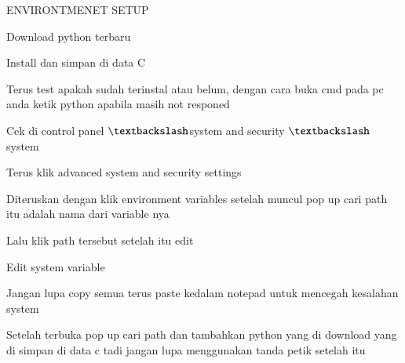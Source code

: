 \documentclass[a4paper,12pt]{report}
\begin{document}
\sloppy
{\fontsize{14pt}{14pt}\selectfont ENVIRONTMENET SETUP \\} \par
\vspace{14pt}
\noindent 
{\fontsize{14pt}{14pt}\selectfont Download python terbaru \\} \par
\vspace{14pt}
\noindent 
{\fontsize{14pt}{14pt}\selectfont Install dan simpan di data C \\} \par
\vspace{14pt}
\noindent 
{\fontsize{14pt}{14pt}\selectfont Terus test apakah sudah terinstal atau belum, dengan cara buka cmd pada pc anda ketik python apabila masih not responed \\} \par
\vspace{14pt}
\noindent 
{\fontsize{14pt}{14pt}\selectfont Cek di control panel $  \textbackslash  $system and security $  \textbackslash  $system \\} \par
\vspace{14pt}
\noindent 
{\fontsize{14pt}{14pt}\selectfont Terus klik advanced system and security settings \\} \par
\vspace{14pt}
\noindent 
{\fontsize{14pt}{14pt}\selectfont Diteruskan dengan klik environment variables setelah muncul pop up cari path itu adalah nama dari variable nya \\} \par
\vspace{14pt}
\noindent 
{\fontsize{14pt}{14pt}\selectfont Lalu klik path tersebut setelah itu edit \\} \par
\vspace{14pt}
\noindent 
{\fontsize{14pt}{14pt}\selectfont Edit system variable \\} \par
\vspace{14pt}
\noindent 
{\fontsize{14pt}{14pt}\selectfont Jangan lupa copy semua terus paste kedalam notepad untuk mencegah kesalahan system \\} \par
\vspace{14pt}
\noindent 
{\fontsize{14pt}{14pt}\selectfont Setelah terbuka pop up cari path dan tambahkan python yang di download yang di simpan di data c tadi jangan lupa menggunakan tanda petik setelah itu \\} \par
\end{document}
